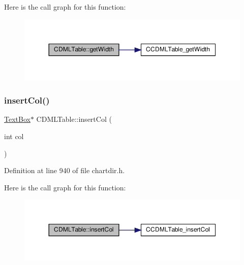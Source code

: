Here is the call graph for this function\+:
\nopagebreak
\begin{figure}[H]
\begin{center}
\leavevmode
\includegraphics[width=350pt]{class_c_d_m_l_table_abe6213c358907a33d677ee3c18c74199_cgraph}
\end{center}
\end{figure}
\mbox{\label{class_c_d_m_l_table_afe0bd5a4fac2fbdb0e496c0012d4a851}} 
\subsubsection{\texorpdfstring{insert\+Col()}{insertCol()}}
{\footnotesize\ttfamily \hyperlink{class_text_box}{Text\+Box}$\ast$ C\+D\+M\+L\+Table\+::insert\+Col (\begin{DoxyParamCaption}\item[{int}]{col }\end{DoxyParamCaption})\hspace{0.3cm}{\ttfamily [inline]}}



Definition at line 940 of file chartdir.\+h.

Here is the call graph for this function\+:
\nopagebreak
\begin{figure}[H]
\begin{center}
\leavevmode
\includegraphics[width=350pt]{class_c_d_m_l_table_afe0bd5a4fac2fbdb0e496c0012d4a851_cgraph}
\end{center}
\end{figure}
\mbox{\label{class_c_d_m_l_table_aff5435de1e1d2a179c50030267feac49}} 
